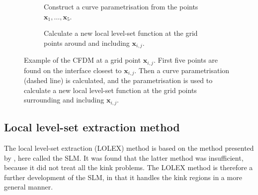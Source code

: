 \documentclass[11pt,b5paper,DIV=calc,BCOR1.3cm,headings=small,%
               footinclude=false,headsepline]{scrbook}
\newcommand*{\vct}[1]{\ensuremath{\boldsymbol{#1}}}
\begin{document}
\begin{figure}[tbp]
\begin{subfigure}[t]{0.49\textwidth}
    \caption{Construct a curve parametrisation from the points $\vct
      x_1,\dots,\vct x_5$.}
  \end{subfigure}
  \begin{subfigure}[t]{0.49\textwidth}
    \centering
    \caption{Calculate a new local level-set function at the grid points around
      and including $\vct x_{i,j}$.}
  \end{subfigure}
  \caption{Example of the CFDM at a grid point $\vct x_{i,j}$.  First five
    points are found on the interface closest to $\vct x_{i,j}$.  Then a curve
    parametrisation (dashed line) is calculated, and the parametrisation is
    used to calculate a new local level-set function at the grid points
    surrounding and including $\vct x_{i,j}$.}
  \label{fig:cfdm}
\end{figure}

\subsection{Local level-set extraction method}
\label{sec:lolex}
The local level-set extraction (LOLEX) method is based on the method presented
by \citet{Salac08}, here called the SLM.  It was found that the latter method
was insufficient, because it did not treat all the kink problems.  The LOLEX
method is therefore a further development of the SLM, in that it handles the
kink regions in a more general manner.
\end{document}
